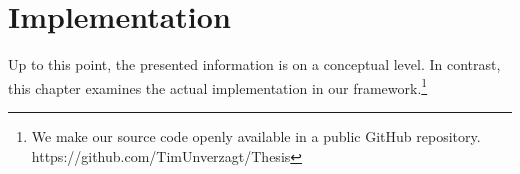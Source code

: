 \chapter{Implementation}
\label{ch:implementation}


Up to this point, the presented information is on a conceptual level. In contrast, this chapter examines the actual implementation in our framework.\footnote{We make our source code openly available in a public GitHub repository.\\ https://github.com/TimUnverzagt/Thesis}

